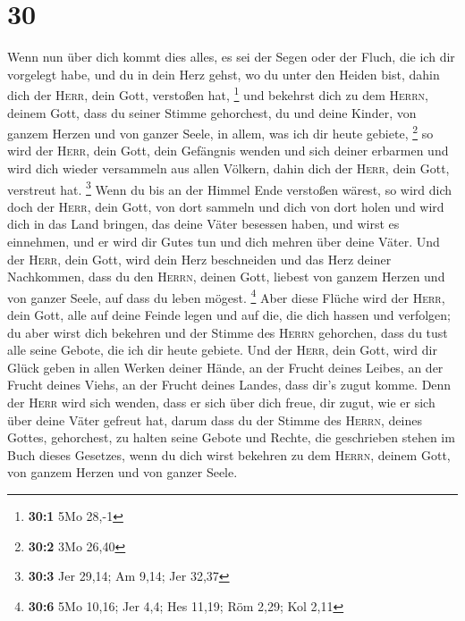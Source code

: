 \hypertarget{section-9}{%
\section{30}\label{section-9}}

 Wenn nun über dich kommt dies alles, es sei der Segen
oder der Fluch, die ich dir vorgelegt habe, und du in dein Herz gehst,
wo du unter den Heiden bist, dahin dich der \textsc{Herr}, dein Gott,
verstoßen hat, \footnote{\textbf{30:1} 5Mo 28,-1}  und
bekehrst dich zu dem \textsc{Herrn}, deinem Gott, dass du seiner Stimme
gehorchest, du und deine Kinder, von ganzem Herzen und von ganzer Seele,
in allem, was ich dir heute gebiete, \footnote{\textbf{30:2} 3Mo 26,40}
 so wird der \textsc{Herr}, dein Gott, dein Gefängnis
wenden und sich deiner erbarmen und wird dich wieder versammeln aus
allen Völkern, dahin dich der \textsc{Herr}, dein Gott, verstreut hat.
\footnote{\textbf{30:3} Jer 29,14; Am 9,14; Jer 32,37} 
Wenn du bis an der Himmel Ende verstoßen wärest, so wird dich doch der
\textsc{Herr}, dein Gott, von dort sammeln und dich von dort holen
 und wird dich in das Land bringen, das deine Väter
besessen haben, und wirst es einnehmen, und er wird dir Gutes tun und
dich mehren über deine Väter.  Und der \textsc{Herr}, dein
Gott, wird dein Herz beschneiden und das Herz deiner Nachkommen, dass du
den \textsc{Herrn}, deinen Gott, liebest von ganzem Herzen und von
ganzer Seele, auf dass du leben mögest. \footnote{\textbf{30:6} 5Mo
  10,16; Jer 4,4; Hes 11,19; Röm 2,29; Kol 2,11}  Aber
diese Flüche wird der \textsc{Herr}, dein Gott, alle auf deine Feinde
legen und auf die, die dich hassen und verfolgen;  du aber
wirst dich bekehren und der Stimme des \textsc{Herrn} gehorchen, dass du
tust alle seine Gebote, die ich dir heute gebiete.  Und
der \textsc{Herr}, dein Gott, wird dir Glück geben in allen Werken
deiner Hände, an der Frucht deines Leibes, an der Frucht deines Viehs,
an der Frucht deines Landes, dass dir's zugut komme. Denn der
\textsc{Herr} wird sich wenden, dass er sich über dich freue, dir zugut,
wie er sich über deine Väter gefreut hat,  darum dass du
der Stimme des \textsc{Herrn}, deines Gottes, gehorchest, zu halten
seine Gebote und Rechte, die geschrieben stehen im Buch dieses Gesetzes,
wenn du dich wirst bekehren zu dem \textsc{Herrn}, deinem Gott, von
ganzem Herzen und von ganzer Seele.

